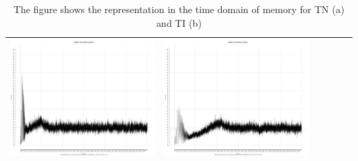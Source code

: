 \begin{table}[htbp]
{\begin{tabular}{l | ccccc}
\begin{minipage}{.15\textwidth}
     			 	\includegraphics[width=\linewidth]{images/mema-triple/I14}
    				 \end{minipage}
    			   &	 \begin{minipage}{.15\textwidth}\vspace{2pt}     							
     			 	\includegraphics[width=\linewidth]{images/mema-triple/I15}
    				 \end{minipage}\\
		\hline %
	 \end{tabular}
	}
	\caption[\textsc{Analyser} Investigation Stack - Level 2 - Pattern Identification - Memory - Baselines TN and NI]{The figure shows the  representation in the time domain of memory for TN (a) and TI (b)} 
 	\label{tab:level2-memory-triple}
\end{table}